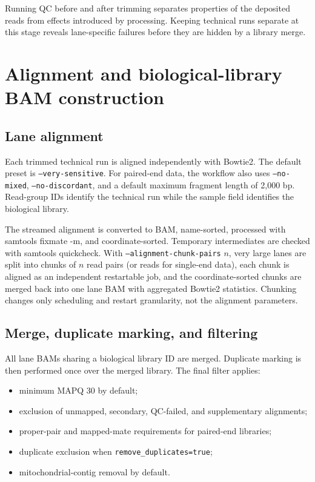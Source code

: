\documentclass[11pt]{article}
\newcommand{\software}[1]{\textsf{#1}}
\begin{document}
Running QC before and after trimming separates properties of the deposited
reads from effects introduced by processing.  Keeping technical runs separate
at this stage reveals lane-specific failures before they are hidden by a
library merge.

\section{Alignment and biological-library BAM construction}

\subsection{Lane alignment}

Each trimmed technical run is aligned independently with \software{Bowtie2}.
The default preset is \texttt{--very-sensitive}.  For paired-end data, the
workflow also uses \texttt{--no-mixed}, \texttt{--no-discordant}, and a default
maximum fragment length of 2,000 bp.  Read-group IDs identify the technical
run while the sample field identifies the biological library.

The streamed alignment is converted to BAM, name-sorted, processed with
\software{samtools fixmate -m}, and coordinate-sorted.  Temporary intermediates
are checked with \software{samtools quickcheck}.  With
\texttt{--alignment-chunk-pairs} \(n\), very large lanes are split into chunks
of \(n\) read pairs (or reads for single-end data), each chunk is aligned as an
independent restartable job, and the coordinate-sorted chunks are merged back
into one lane BAM with aggregated Bowtie2 statistics.  Chunking changes only
scheduling and restart granularity, not the alignment parameters.

\subsection{Merge, duplicate marking, and filtering}

All lane BAMs sharing a biological library ID are merged.  Duplicate marking
is then performed once over the merged library.  The final filter applies:

\begin{itemize}
  \item minimum MAPQ 30 by default;
  \item exclusion of unmapped, secondary, QC-failed, and supplementary
  alignments;
  \item proper-pair and mapped-mate requirements for paired-end libraries;
  \item duplicate exclusion when \texttt{remove\_duplicates=true};
  \item mitochondrial-contig removal by default.
\end{itemize}
\end{document}
